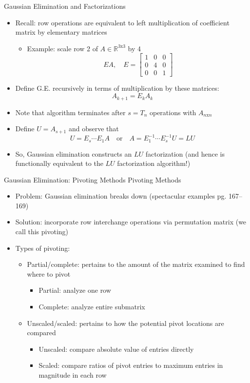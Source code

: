 \documentclass[9pt, serif]{beamer}
\newlength{\wideitemsep}
\let\olditem\item
\renewcommand{\item}{\setlength{\itemsep}{\wideitemsep}\olditem}
\newcommand{\bi}{\begin{itemize}}
\newcommand{\ei}{\end{itemize}}
\begin{document}
\begin{frame}{Gaussian Elimination and Factorizations}
    \bi
        \item Recall: row operations are equivalent to left multiplication of coefficient matrix by elementary matrices \pause
        \bi
            \item Example: scale row 2 of $A \in \mathbb{R}^{3\text{x}3}$ by 4 $$EA,\quad E = \begin{bmatrix}1&0&0\\0&4&0\\0&0&1\end{bmatrix}$$
        \ei \pause
        \item Define G.E. recursively in terms of multiplication by these matrices: $$A_{k+1} = E_kA_k$$ \vspace{-5mm} \pause
        \item Note that algorithm terminates after $s = T_n$ operations with $A_{n\text{x}n}$ \pause
        \item Define $U = A_{s+1}$ and observe that $$U = E_s\cdots E_1A \quad \text{or} \quad A = E^{-1}_1\cdots E^{-1}_sU = LU$$ \vspace{-5mm} \pause
        \item So, Gaussian elimination constructs an $LU$ factorization (and hence is functionally equivalent to the $LU$ factorization algorithm!)
    \ei
\end{frame}


\begin{frame}{Gaussian Elimination: Pivoting Methods}
    Pivoting Methods \pause
    \bi
        \item Problem: Gaussian elimination breaks down (spectacular examples pg. 167--169) \pause
        \item Solution: incorporate row interchange operations via permutation matrix (we call this pivoting) \pause
        \item Types of pivoting:
        \bi
            \item Partial/complete: pertains to the amount of the matrix examined to find where to pivot \pause
            \bi
                \item Partial: analyze one row
                \item Complete: analyze entire submatrix
            \ei \pause
            \item Unscaled/scaled: pertains to how the potential pivot locations are compared \pause
            \bi
                \item Unscaled: compare absolute value of entries directly
                \item Scaled: compare ratios of pivot entries to maximum entries in magnitude in each row
            \ei
        \ei
    \ei
\end{frame}
\end{document}
